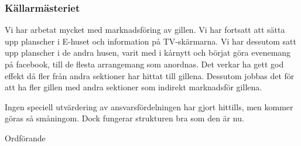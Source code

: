 \documentclass[../_main/handlingar.tex]{subfiles}
\begin{document}

\subsubsection*{Källarmästeriet}
Vi har arbetat mycket med marknadsföring av gillen. Vi har fortsatt att sätta upp planscher i E-huset och information på TV-skärmarna. Vi har dessutom satt upp planscher i de andra husen, varit med i kårnytt och börjat göra evenemang på facebook, till de flesta arrangemang som anordnas. Det verkar ha gett god effekt då fler från andra sektioner har hittat till gillena. Dessutom jobbas det för att ha fler gillen med andra sektioner som indirekt marknadsför gillena.

Ingen speciell utvärdering av ansvarsfördelningen har gjort hittills, men kommer göras så småningom. Dock fungerar strukturen bra som den är nu.

\begin{signatures}{1}
    \ist
    \signature{\ordf}{Ordförande}
\end{signatures}
\end{document}
